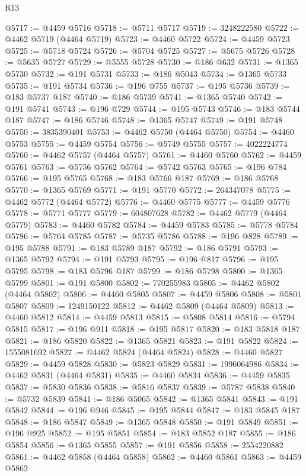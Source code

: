 \begin{lexlean}{R13}
\begin{coremodule}
@5717 := @4459 @5716
@5718 := @5711 @5717
@5719 := 3248222580
@5722 := @4462 @5719 (@4464 @5719)
@5723 := @4460 @5722
@5724 := @4459 @5723
@5725 := @5718 @5724
@5726 := @5704 @5725
@5727 := @5675 @5726
@5728 := @5635 @5727
@5729 := @5555 @5728
@5730 := @186 @632
@5731 := @1365 @5730
@5732 := @191 @5731
@5733 := @186 @5043
@5734 := @1365 @5733
@5735 := @191 @5734
@5736 := @196 @755
@5737 := @195 @5736
@5739 := @183 @5737 @187
@5740 := @186 @5739
@5741 := @1365 @5740
@5742 := @191 @5741
@5743 := @196 @729
@5744 := @195 @5743
@5746 := @183 @5744 @187
@5747 := @186 @5746
@5748 := @1365 @5747
@5749 := @191 @5748
@5750 := 3835390401
@5753 := @4462 @5750 (@4464 @5750)
@5754 := @4460 @5753
@5755 := @4459 @5754
@5756 := @5749 @5755
@5757 := 4022224774
@5760 := @4462 @5757 (@4464 @5757)
@5761 := @4460 @5760
@5762 := @4459 @5761
@5763 := @5756 @5762
@5764 := @5742 @5763
@5765 := @196 @784
@5766 := @195 @5765
@5768 := @183 @5766 @187
@5769 := @186 @5768
@5770 := @1365 @5769
@5771 := @191 @5770
@5772 := 264347078
@5775 := @4462 @5772 (@4464 @5772)
@5776 := @4460 @5775
@5777 := @4459 @5776
@5778 := @5771 @5777
@5779 := 604807628
@5782 := @4462 @5779 (@4464 @5779)
@5783 := @4460 @5782
@5784 := @4459 @5783
@5785 := @5778 @5784
@5786 := @5764 @5785
@5787 := @5735 @5786
@5788 := @196 @828
@5789 := @195 @5788
@5791 := @183 @5789 @187
@5792 := @186 @5791
@5793 := @1365 @5792
@5794 := @191 @5793
@5795 := @196 @817
@5796 := @195 @5795
@5798 := @183 @5796 @187
@5799 := @186 @5798
@5800 := @1365 @5799
@5801 := @191 @5800
@5802 := 770255983
@5805 := @4462 @5802 (@4464 @5802)
@5806 := @4460 @5805
@5807 := @4459 @5806
@5808 := @5801 @5807
@5809 := 1249150122
@5812 := @4462 @5809 (@4464 @5809)
@5813 := @4460 @5812
@5814 := @4459 @5813
@5815 := @5808 @5814
@5816 := @5794 @5815
@5817 := @196 @911
@5818 := @195 @5817
@5820 := @183 @5818 @187
@5821 := @186 @5820
@5822 := @1365 @5821
@5823 := @191 @5822
@5824 := 1555081692
@5827 := @4462 @5824 (@4464 @5824)
@5828 := @4460 @5827
@5829 := @4459 @5828
@5830 := @5823 @5829
@5831 := 1996064986
@5834 := @4462 @5831 (@4464 @5831)
@5835 := @4460 @5834
@5836 := @4459 @5835
@5837 := @5830 @5836
@5838 := @5816 @5837
@5839 := @5787 @5838
@5840 := @5732 @5839
@5841 := @186 @5065
@5842 := @1365 @5841
@5843 := @191 @5842
@5844 := @196 @946
@5845 := @195 @5844
@5847 := @183 @5845 @187
@5848 := @186 @5847
@5849 := @1365 @5848
@5850 := @191 @5849
@5851 := @196 @925
@5852 := @195 @5851
@5854 := @183 @5852 @187
@5855 := @186 @5854
@5856 := @1365 @5855
@5857 := @191 @5856
@5858 := 2554220882
@5861 := @4462 @5858 (@4464 @5858)
@5862 := @4460 @5861
@5863 := @4459 @5862

\end{coremodule}
\end{lexlean}
